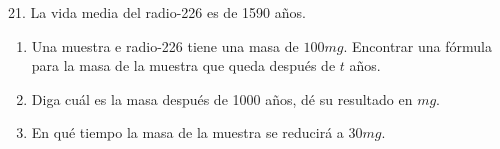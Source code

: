 \documentclass[12pt]{article}
\begin{document}
21. La vida media del radio-226 es de 1590 años.

\begin{enumerate}[\hspace{9px} a)]
    \item Una muestra e radio-226 tiene una masa de $100mg$. Encontrar una fórmula para la masa de la muestra que queda después de $t$ años.

    \item Diga cuál es la masa después de 1000 años, dé su resultado en $mg$.

    \item En qué tiempo la masa de la muestra se reducirá a $30mg$.

\end{enumerate}
\end{document}
